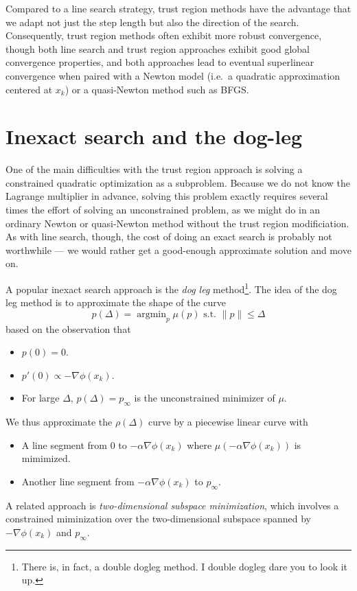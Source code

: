 \documentclass[12pt, leqno]{article} %
\begin{document}
Compared to a line search strategy, trust region methods have the
advantage that we adapt not just the step length but also the
direction of the search.  Consequently, trust region methods often
exhibit more robust convergence, though both line search and trust
region approaches exhibit good global convergence properties,
and both approaches lead to eventual superlinear convergence when
paired with a Newton model (i.e.~a quadratic approximation centered
at $x_k$) or a quasi-Newton method such as BFGS.

\section{Inexact search and the dog-leg}

One of the main difficulties with the trust region approach is solving
a constrained quadratic optimization as a subproblem.  Because we do
not know the Lagrange multiplier in advance, solving this problem
exactly requires several times the effort of solving an unconstrained
problem, as we might do in an ordinary Newton or quasi-Newton method
without the trust region modificiation.  As with line
search, though, the cost of doing an exact search is probably not
worthwhile --- we would rather get a good-enough approximate solution
and move on.

A popular inexact search approach is the {\em dog leg}
method\footnote{There is, in fact, a double dogleg method.  I double
  dogleg dare you to look it up.}.
The idea of the dog leg method is to approximate the shape of the
curve
\[
  p(\Delta) = \operatorname{argmin}_p \mu(p) \mbox{ s.t. } \|p\| \leq \Delta
\]
based on the observation that
\begin{itemize}
\item $p(0) = 0$.
\item $p'(0) \propto -\nabla \phi(x_k)$.
\item For large $\Delta$, $p(\Delta) = p_{\infty}$ is the
  unconstrained minimizer of $\mu$.
\end{itemize}
We thus approximate the $\rho(\Delta)$ curve by a piecewise linear
curve with
\begin{itemize}
\item A line segment from $0$ to $-\alpha \nabla \phi(x_k)$ where
  $\mu(-\alpha \nabla \phi(x_k))$ is mimimized.
\item Another line segment from $-\alpha \nabla \phi(x_k)$ to
  $p_{\infty}$.
\end{itemize}
A related approach is {\em two-dimensional subspace minimization},
which involves a constrained miminization over the two-dimensional
subspace spanned by $-\nabla \phi(x_k)$ and $p_{\infty}$.
\end{document}
